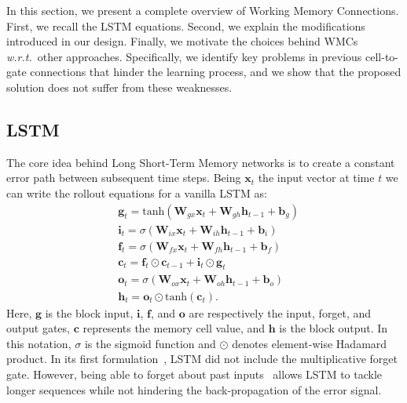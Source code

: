 In this section, we present a complete overview of Working Memory Connections. First, we recall the LSTM equations. Second, we explain the modifications introduced in our design. Finally, we motivate the choices behind WMCs \textit{w.r.t.}~other approaches. Specifically, we identify key problems in previous cell-to-gate connections that hinder the learning process, and we show that the proposed solution does not suffer from these weaknesses.

\subsection{LSTM}
The core idea behind Long Short-Term Memory networks is to create a constant error path between subsequent time steps.
Being $\mathbf{x}_t$ the input vector at time $t$ we can write the rollout equations for a vanilla LSTM as:
\begin{align}
    &\mathbf{g}_t = \text{tanh}
                    (\mathbf{W}_{gx}\mathbf{x}_{t} +
                    \mathbf{W}_{gh} \mathbf{h}_{t-1} +
                    \mathbf{b}_g) \\
    &\mathbf{i}_t = \sigma
                    (\mathbf{W}_{ix}\mathbf{x}_{t} +
                    \mathbf{W}_{ih} \mathbf{h}_{t-1} +
                    \mathbf{b}_i)
                    \label{eq:i} \\
    &\mathbf{f}_t = \sigma
                    (\mathbf{W}_{fx}\mathbf{x}_{t} +
                    \mathbf{W}_{fh} \mathbf{h}_{t-1} +
                    \mathbf{b}_f)
                    \label{eq:f} \\
    &\mathbf{c}_t = \mathbf{f}_t \odot \mathbf{c}_{t-1} +
                    \mathbf{i}_t \odot \mathbf{g}_t \\
    &\mathbf{o}_t = \sigma
                    (\mathbf{W}_{ox}\mathbf{x}_{t} +
                    \mathbf{W}_{oh} \mathbf{h}_{t-1} +
                    \mathbf{b}_o)
                    \label{eq:o} \\
    &\mathbf{h}_t =  \mathbf{o}_t \odot \text{tanh}(\mathbf{c}_t).
                    \label{eq:h}
\end{align}
Here, $\mathbf{g}$ is the block input, $\mathbf{i}$, $\mathbf{f}$, and $\mathbf{o}$ are respectively the input, forget, and output gates, $\mathbf{c}$ represents the memory cell value, and $\mathbf{h}$ is the block output. In this notation, $\sigma$ is the sigmoid function and $\odot$ denotes element-wise Hadamard product.
In its first formulation~\citep{hochreiter1997long}, LSTM did not include the multiplicative forget gate. However, being able to forget about past inputs~\citep{gers2000forget} allows LSTM to tackle longer sequences while not hindering the back-propagation of the error signal.

